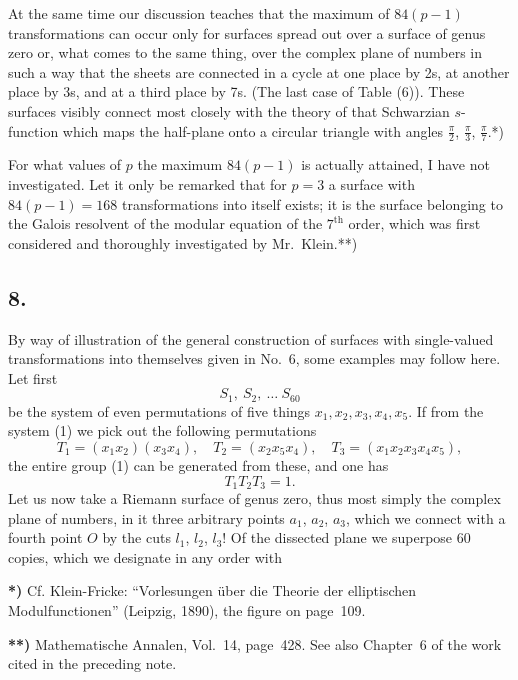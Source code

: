 \documentclass{article}
\begin{document}
At the same time our discussion teaches that the maximum of $84(p - 1)$ transformations can occur only for surfaces spread out over a surface of genus zero or, what comes to the same thing, over the complex plane of numbers in such a way that the sheets are connected in a cycle at one place by 2s, at another place by 3s, and at a third place by 7s. (The last case of Table (6)). These surfaces visibly connect most closely with the theory of that Schwarzian $s$-function which maps the half-plane onto a circular triangle with angles $\frac{\pi}{2}$, $\frac{\pi}{3}$, $\frac{\pi}{7}$.*)

For what values of $p$ the maximum $84(p - 1)$ is actually attained, I have not investigated. Let it only be remarked that for $p = 3$ a surface with $84(p - 1) = 168$ transformations into itself exists; it is the surface belonging to the Galois resolvent of the modular equation of the $7^{\text{th}}$ order, which was first considered and thoroughly investigated by Mr.~Klein.**)

\subsection*{8.}

By way of illustration of the general construction of surfaces with single-valued transformations into themselves given in No.~6, some examples may follow here. Let first
\[
S_1, \ S_2, \ \dots \ S_{60}
\tag{1}
\]
be the system of even permutations of five things $x_1, x_2, x_3, x_4, x_5$. If from the system (1) we pick out the following permutations
\[
T_1 = (x_1 x_2)(x_3 x_4), \quad T_2 = (x_2 x_5 x_4), \quad T_3 = (x_1 x_2 x_3 x_4 x_5),
\]
the entire group (1) can be generated from these, and one has
\[
T_1 T_2 T_3 = 1.
\]
Let us now take a Riemann surface of genus zero, thus most simply the complex plane of numbers, in it three arbitrary points $a_1$, $a_2$, $a_3$, which we connect with a fourth point $O$ by the cuts $l_1$, $l_2$, $l_3$! Of the dissected plane we superpose 60 copies, which we designate in any order with

\textbf{*)} Cf. Klein-Fricke: ``Vorlesungen über die Theorie der elliptischen Modulfunctionen'' (Leipzig, 1890), the figure on page~109.

\textbf{**)} Mathematische Annalen, Vol.~14, page~428. See also Chapter~6 of the work cited in the preceding note.
\end{document}
